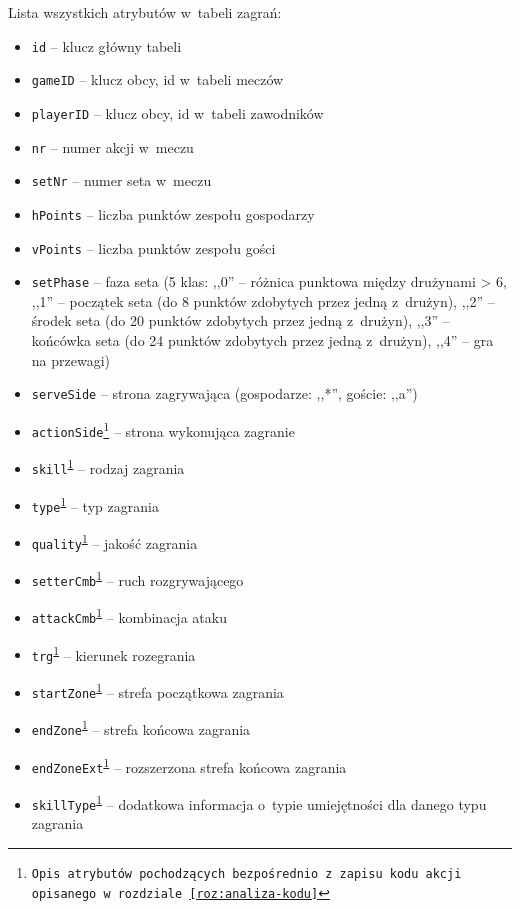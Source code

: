 \documentclass[a4paper,twoside,12pt]{book}
\begin{document}
Lista wszystkich atrybutów w~tabeli zagrań:
\begin{itemize}
\item \texttt{id} -- klucz główny tabeli
\item \texttt{gameID} -- klucz obcy, id w~tabeli meczów
\item \texttt{playerID} -- klucz obcy, id w~tabeli zawodników
\item \texttt{nr} -- numer akcji w~meczu
\item \texttt{setNr} -- numer seta w~meczu
\item \texttt{hPoints} -- liczba punktów zespołu gospodarzy
\item \texttt{vPoints} -- liczba punktów zespołu gości
\item \texttt{setPhase} -- faza seta (5 klas: ,,0'' -- różnica punktowa między drużynami > 6, ,,1'' -- początek seta (do 8 punktów zdobytych przez jedną z~drużyn), ,,2'' -- środek seta (do 20 punktów zdobytych przez jedną z~drużyn), ,,3'' -- końcówka seta (do 24 punktów zdobytych przez jedną z~drużyn), ,,4'' -- gra na przewagi)
\item \texttt{serveSide} -- strona zagrywająca (gospodarze: ,,*'', goście: ,,a'')
\item \texttt{actionSide\footnote{\label{codeSyntax}Opis atrybutów pochodzących bezpośrednio z~zapisu kodu akcji opisanego w~rozdziale \ref{roz:analiza-kodu}}} -- strona wykonująca zagranie
\item \texttt{skill\textsuperscript{\ref{codeSyntax}}} -- rodzaj zagrania
\item \texttt{type\textsuperscript{\ref{codeSyntax}}} -- typ zagrania
\item \texttt{quality\textsuperscript{\ref{codeSyntax}}} -- jakość zagrania
\item \texttt{setterCmb\textsuperscript{\ref{codeSyntax}}} -- ruch rozgrywającego
\item \texttt{attackCmb\textsuperscript{\ref{codeSyntax}}} -- kombinacja ataku
\item \texttt{trg\textsuperscript{\ref{codeSyntax}}} -- kierunek rozegrania
\item \texttt{startZone\textsuperscript{\ref{codeSyntax}}} -- strefa początkowa zagrania
\item \texttt{endZone\textsuperscript{\ref{codeSyntax}}} -- strefa końcowa zagrania
\item \texttt{endZoneExt\textsuperscript{\ref{codeSyntax}}} -- rozszerzona strefa końcowa zagrania
\item \texttt{skillType\textsuperscript{\ref{codeSyntax}}} -- dodatkowa informacja o~typie umiejętności dla danego typu zagrania

\end{itemize}
\end{document}
